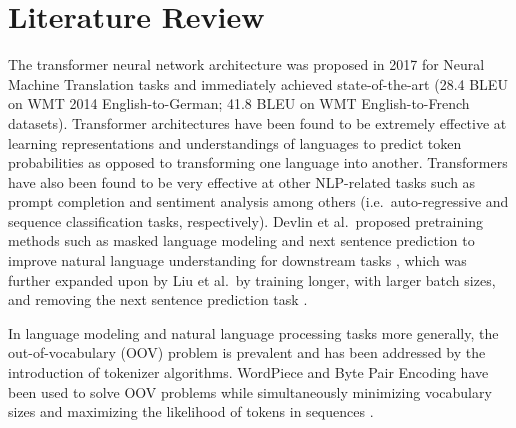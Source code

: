 \documentclass[12pt]{article}
\begin{document}
\section{Literature Review}\label{sec:lit_review}
The transformer neural network architecture was proposed in 2017 for Neural Machine Translation tasks and immediately achieved
state-of-the-art (28.4 BLEU on WMT 2014 English-to-German; 41.8 BLEU on WMT English-to-French datasets)\cite{vaswani_attention_2017}. Transformer
architectures have been found to be extremely effective at learning representations and understandings of languages to predict token probabilities as
opposed to transforming one language into another\cite{devlin_bert_2019,liu_roberta_2019}. Transformers have also been found to be very effective at
other NLP-related tasks such as prompt completion and sentiment analysis among others (i.e.~auto-regressive and sequence classification tasks,
respectively)\cite{lewis_bart_2019,radford_improving_2018}. Devlin et al.~proposed pretraining methods such as masked language
modeling and next sentence prediction to improve natural language understanding for downstream tasks \cite{devlin_bert_2019}, which was further
expanded upon by Liu et al.~by training longer, with larger batch sizes, and removing the next sentence prediction task \cite{liu_roberta_2019}.

In language modeling and natural language processing tasks more generally, the out-of-vocabulary (OOV) problem is prevalent and has been addressed by
the introduction of tokenizer algorithms. WordPiece and Byte Pair Encoding have been used to solve OOV problems while simultaneously minimizing
vocabulary sizes and maximizing the likelihood of tokens in sequences \cite{wu_googles_2016,schuster_japanese_2012,sennrich_neural_2016}.
\end{document}
